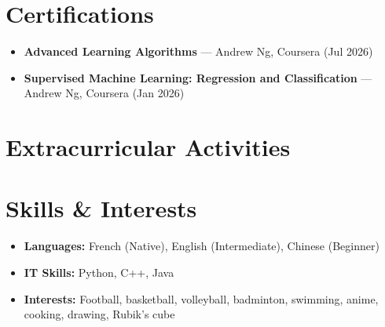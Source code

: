 \documentclass[11pt,a4paper]{moderncv}
\begin{document}
\section{Certifications}

\begin{itemize}[leftmargin=.2in, topsep=2pt]
\setlength\itemsep{.15em}
\item \textbf{Advanced Learning Algorithms} — Andrew Ng, Coursera (Jul 2026)
\item \textbf{Supervised Machine Learning: Regression and Classification} — Andrew Ng, Coursera (Jan 2026)
\end{itemize}


\section{Extracurricular Activities}



\section{Skills \& Interests}

\begin{itemize}[leftmargin=.2in, topsep=2pt]
\setlength\itemsep{.15em}
\item \textbf{Languages:} French (Native), English (Intermediate), Chinese (Beginner)
\item \textbf{IT Skills:} Python, C++, Java
\item \textbf{Interests:} Football, basketball, volleyball, badminton, swimming, anime, cooking, drawing, Rubik's cube
\end{itemize}
\end{document}

